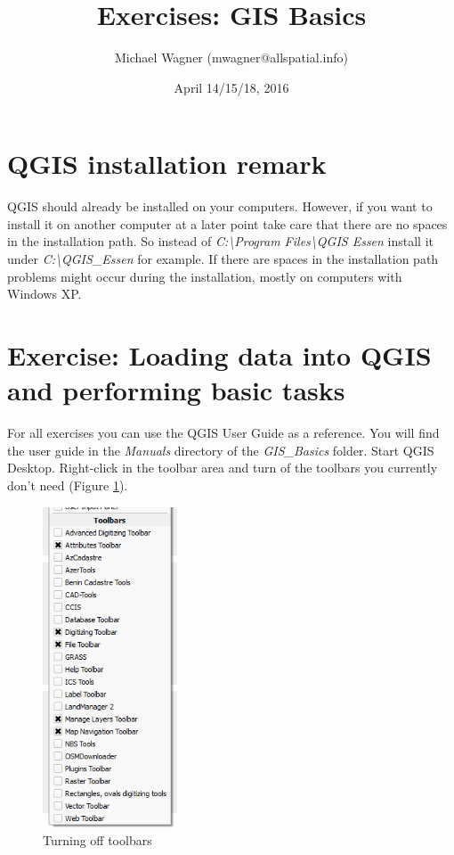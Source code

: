 \documentclass[a4paper,12pt,titlepage]{article}
\title{Exercises: GIS Basics}
\author{Michael Wagner (mwagner@allspatial.info)}      													%
\date{April 14/15/18, 2016}
\begin{document}
\maketitle

\tableofcontents
\listoffigures
\lstlistoflistings
\newpage

\section{QGIS installation remark}
QGIS should already be installed on your computers. However, if you want to install it on another computer at a later point take care that there are no spaces in the installation path. So instead of \textit{C:\textbackslash Program Files\textbackslash QGIS Essen} install it under \textit{C:\textbackslash QGIS\_Essen} for example. If there are spaces in the installation path problems might occur during the installation, mostly on computers with Windows XP.

\section{Exercise: Loading data into QGIS and performing basic tasks}

For all exercises you can use the QGIS User Guide as a reference. You will find the user guide in the \textit{Manuals} directory of the \textit{GIS\_Basics} folder.
Start QGIS Desktop. Right-click in the toolbar area and turn of the toolbars you currently don't need (Figure \ref{fig:turn_off_toolbars}).

\begin{figure}[h]
\centering
\includegraphics[width=4cm]{Images/turn_off_toolbars.png}
\caption{Turning off toolbars}\label{fig:turn_off_toolbars}
\end{figure}
\end{document}
